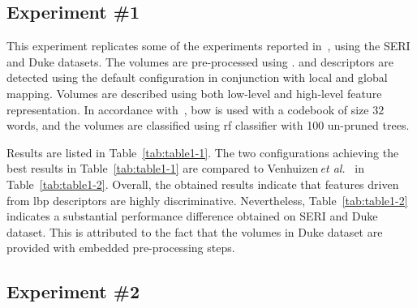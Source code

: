 \subsection{Experiment \#1}\label{subsec:exp1}

%
%
%

This experiment replicates some of the experiments reported in~\cite{Lemaintre2015miccaiOCT}, using the SERI and Duke datasets.
The volumes are pre-processed using \nlm.
\lbp and \lbptop descriptors are detected using the default configuration in conjunction with local and global mapping.
Volumes are described using both low-level and high-level feature representation.
In accordance with~\cite{Lemaintre2015miccaiOCT}, \ac{bow} is used with a codebook of size $32$ words, and the volumes are classified using \ac{rf} classifier with 100 un-pruned trees.

Results are listed in Table~\ref{tab:table1-1}.
The two configurations achieving the best results in Table~\ref{tab:table1-1} are compared to Venhuizen\,\textit{et al.}~\cite{Venhuizen2015} in Table~\ref{tab:table1-2}. 
Overall, the obtained results indicate that features driven from \ac{lbp} descriptors are highly discriminative.
Nevertheless, Table~\ref{tab:table1-2} indicates a substantial performance difference obtained on SERI and Duke dataset.
This is attributed to the fact that the volumes in Duke dataset are provided with embedded pre-processing steps.






\subsection{Experiment \#2}\label{subsec:exp2}
%
%
%
%

